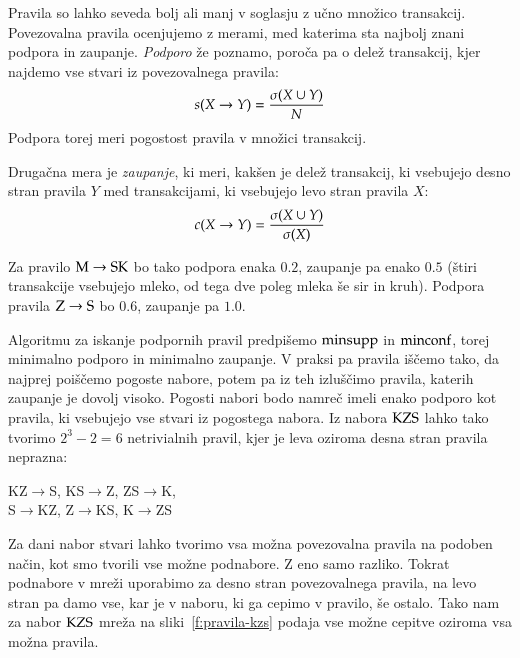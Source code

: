 Pravila so lahko seveda bolj ali manj v soglasju z učno množico transakcij. Povezovalna pravila ocenjujemo z merami, med katerima sta najbolj znani podpora in zaupanje. {\em Podporo} že poznamo, poroča pa o delež transakcij, kjer najdemo vse stvari iz povezovalnega pravila:
\begin{equation}
  s(X\to Y)={\sigma(X\cup Y)\over N}
\end{equation}
Podpora torej meri pogostost pravila v množici transakcij.

Drugačna mera je {\em zaupanje}, ki meri, kakšen je delež transakcij, ki vsebujejo desno stran pravila $Y$ med transakcijami, ki vsebujejo levo stran pravila $X$:
\begin{equation}
  c(X\to Y)={\sigma(X\cup Y)\over\sigma(X)}
\end{equation}

Za pravilo ${\rm M}\to {\rm SK}$ bo tako podpora enaka $0.2$, zaupanje pa enako $0.5$ (štiri transakcije vsebujejo mleko, od tega dve poleg mleka še sir in kruh). Podpora pravila ${\rm Z}\to{\rm S}$ bo $0.6$, zaupanje pa $1.0$.

Algoritmu za iskanje podpornih pravil predpišemo ${\rm minsupp}$ in ${\rm minconf}$, torej minimalno podporo in minimalno zaupanje. V praksi pa pravila iščemo tako, da najprej poiščemo pogoste nabore, potem pa iz teh izluščimo pravila, katerih zaupanje je dovolj visoko. Pogosti nabori bodo namreč imeli enako podporo kot pravila, ki vsebujejo vse stvari iz pogostega nabora. Iz nabora ${\rm KZS}$ lahko tako tvorimo $2^3-2=6$ netrivialnih pravil, kjer je leva oziroma desna stran pravila neprazna:

\begin{center}
  KZ$\to$S, KS$\to$Z, ZS$\to$K, \\
  S$\to$KZ, Z$\to$KS, K$\to$ZS
\end{center}

Za dani nabor stvari lahko tvorimo vsa možna povezovalna pravila na podoben način, kot smo tvorili vse možne podnabore. Z eno samo razliko. Tokrat podnabore v mreži uporabimo za desno stran povezovalnega pravila, na levo stran pa damo vse, kar je v naboru, ki ga cepimo v pravilo, še ostalo. Tako nam za nabor ${\rm KZS}$ mreža na sliki~\ref{f:pravila-kzs} podaja vse možne cepitve oziroma vsa možna pravila.


